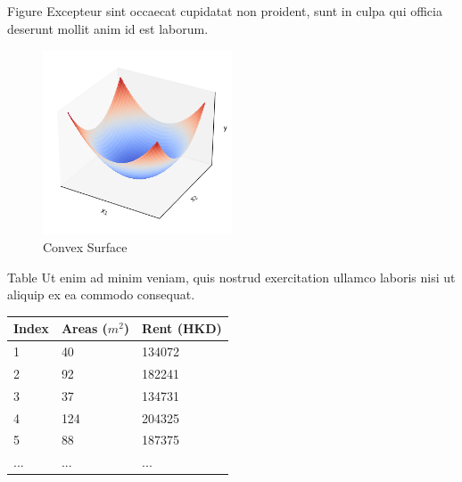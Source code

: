 \documentclass{beamer}
\begin{document}
\begin{frame}{Figure}
    Excepteur sint occaecat cupidatat non proident, sunt in culpa qui officia deserunt mollit anim id est laborum.
    \begin{figure}
        \includegraphics[width=0.5\textwidth]{images/convex_surface.png}
    \caption{Convex Surface}
    \end{figure}
\end{frame}

\begin{frame}{Table}
    Ut enim ad minim veniam, quis nostrud exercitation ullamco laboris nisi ut aliquip ex ea commodo consequat.
    \vspace{0.4in}
    \begin{table}
        \footnotesize
        \begin{tabular}{l | l | l}
        Index & Areas ($m^2$) & Rent (HKD) \\
        \hline \hline
        1 & 40 & 134072 \\ 
        2 & 92 & 182241 \\
        3 & 37 & 134731 \\
        4 & 124 & 204325 \\
        5 & 88 & 187375 \\
        ... & ... & ...
        \end{tabular}
    \end{table}
\end{frame}

\end{document}
